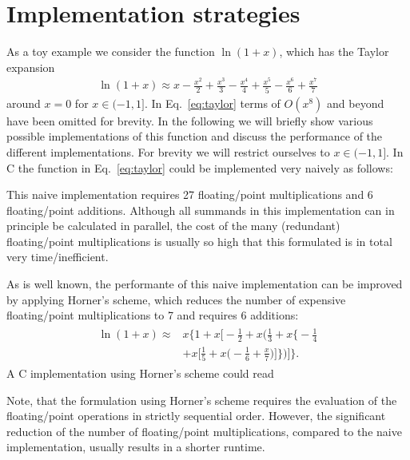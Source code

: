 \documentclass[10pt,DIV16,twocolumn,numbers=noenddot]{scrartcl}
\begin{document}
\section{Implementation strategies}
\label{sec:toymodel}

As a toy example we consider the function $\ln(1+x)$, which has the
Taylor expansion
%
\begin{align}
  \ln(1+x) \approx x - \frac{x^2}{2} + \frac{x^3}{3} - \frac{x^4}{4} + \frac{x^5}{5} - \frac{x^6}{6} + \frac{x^7}{7}
  \label{eq:taylor}
\end{align}
%
around $x=0$ for $x\in(-1,1]$.  In Eq.~\eqref{eq:taylor} terms of
$O(x^8)$ and beyond have been omitted for brevity.  In the following
we will briefly show various possible implementations of this function
and discuss the performance of the different implementations.  For
brevity we will restrict ourselves to $x\in(-1,1]$.  In C the function
in Eq.~\eqref{eq:taylor} could be implemented very naively as follows:
%

%
This naive implementation requires 27 floating\-/point multiplications
and 6 floating\-/point additions.  Although all summands in this
implementation can in principle be calculated in parallel, the cost of
the many (redundant) floating\-/point multiplications is usually so
high that this formulated is in total very time\-/inefficient.

As is well known, the performante of this naive implementation can be
improved by applying Horner's scheme, which reduces the number of
expensive floating\-/point multiplications to 7 and requires 6
additions:
%
\begin{align}
\begin{split}
  \ln(1+x) \approx{}& x \bigg\{1 + x \bigg[-\frac{1}{2} + x \bigg(\frac{1}{3} + x \bigg\{-\frac{1}{4} \\
  &+ x \bigg[\frac{1}{5} + x\bigg(-\frac{1}{6} + \frac{x}{7}\bigg)\bigg]\bigg\}\bigg)\bigg]\bigg\}.
\end{split}\label{eq:horner}%
\end{align}
%
A C implementation using Horner's scheme could read
%

%
Note, that the formulation using Horner's scheme requires the
evaluation of the floating\-/point operations in strictly sequential
order.  However, the significant reduction of the number of
floating\-/point multiplications, compared to the naive
implementation, usually results in a shorter runtime.
\end{document}
